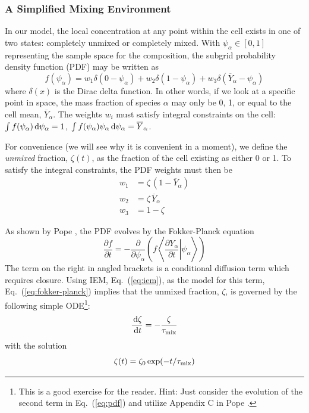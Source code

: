 \subsubsection{A Simplified Mixing Environment}

In our model, the local concentration at any point within the cell exists in one of two states: completely unmixed or completely mixed.  With $\psi_\alpha \in [0,1]$ representing the sample space for the composition, the subgrid probability density function (PDF) may be written as
\begin{equation}
\label{eq:pdf}
f(\psi_\alpha) = w_1 \delta(0-\psi_\alpha) + w_2 \delta(1-\psi_\alpha) + w_3 \delta(\overline{Y}_\alpha - \psi_\alpha)
\end{equation}
where $\delta(x)$ is the Dirac delta function.  In other words, if we look at a specific point in space, the mass fraction of species $\alpha$ may only be 0, 1, or equal to the cell mean, $\overline{Y}_\alpha$.  The weights $w_i$ must satisfy integral constraints on the cell: $\int f(\psi_\alpha) \,\mathrm{d} \psi_\alpha = 1$, $\int f(\psi_\alpha) \psi_\alpha \,\mathrm{d} \psi_\alpha = \overline{Y}_\alpha$.

For convenience (we will see why it is convenient in a moment), we define the \emph{unmixed} fraction, $\zeta(t)$, as the fraction of the cell existing as either 0 or 1.  To satisfy the integral constraints, the PDF weights must then be
\begin{align}
w_1 &= \zeta \, (1 - \overline{Y}_\alpha) \\
w_2 &= \zeta \, \overline{Y}_\alpha \\
w_3 &= 1-\zeta
\end{align}

As shown by Pope \cite{Pope:2000}, the PDF evolves by the Fokker-Planck equation
\begin{equation}
\label{eq:fokker-planck}
\frac{\partial f}{\partial t} = -\frac{\partial}{\partial \psi_\alpha} \left(f \left\langle \left. \frac{\partial Y_\alpha}{\partial t} \right| \psi_\alpha \right\rangle \right)
\end{equation}
The term on the right in angled brackets is a conditional diffusion term which requires closure.  Using IEM, Eq.~(\ref{eq:iem}), as the model for this term, Eq.~(\ref{eq:fokker-planck}) implies that the unmixed fraction, $\zeta$, is governed by the following simple ODE\footnote{This is a good exercise for the reader.  Hint: Just consider the evolution of the second term in Eq.~(\ref{eq:pdf}) and utilize Appendix C in Pope \cite{Pope:2000}.}:
\begin{equation}
\label{eq:zeta}
\frac{\,\mathrm{d} \zeta}{\,\mathrm{d} t}=-\frac{\zeta}{\tau_{\rm mix}}
\end{equation}
with the solution
\begin{equation}
\label{eq:zeta_soln}
\zeta(t) = \zeta_0 \exp(-t/\tau_{\rm mix})
\end{equation}


